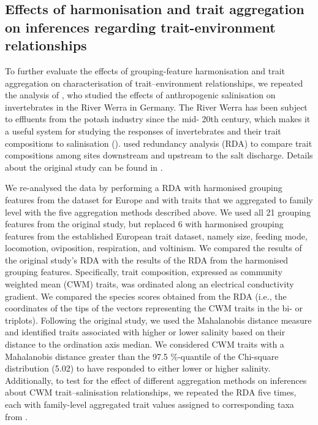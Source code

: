\documentclass[12pt]{article}
\begin{document}

\subsection*{Effects of harmonisation and trait aggregation on inferences regarding trait-environment relationships}

To further evaluate the effects of grouping-feature harmonisation and trait aggregation on characterisation of trait–environment relationships, we repeated the analysis of \citet{szocs_effects_2014}, who studied the effects of anthropogenic salinisation on invertebrates in the River Werra in Germany. The River Werra has been subject to effluents from the potash industry since the mid- 20th century, which makes it a useful system for studying the responses of invertebrates and their trait compositions to salinisation (\cite{bathe_biological_2011}). \citet{szocs_effects_2014} used redundancy analysis (RDA) to compare trait compositions among sites downstream and upstream to the salt discharge. Details about the original study can be found in \citet{szocs_effects_2014}.

We re-analysed the \citet{szocs_effects_2014} data by performing a RDA with harmonised grouping features from the dataset for Europe and with traits that we aggregated to family level with the five aggregation methods described above. We used all 21 grouping features from the original study, but replaced 6 with harmonised grouping features from the established European trait dataset, namely size, feeding mode, locomotion, oviposition, respiration, and voltinism.
We compared the results of the original study’s RDA with the results of the RDA from the harmonised grouping features. Specifically, trait composition, expressed as community weighted mean (CWM) traits, was ordinated along an electrical conductivity gradient. We compared the species scores obtained from the RDA (i.e., the coordinates of the tips of the vectors representing the CWM traits in the bi- or triplots). Following the original study, we used the Mahalanobis distance measure and identified traits associated with higher or lower salinity based on their distance to the ordination axis median. We considered CWM traits with a Mahalanobis distance greater than the 97.5 \%-quantile of the Chi-square distribution (5.02) to have responded to either lower or higher salinity. Additionally, to test for the effect of different aggregation methods on inferences about CWM trait–salinisation relationships, we repeated the RDA five times, each with family-level aggregated trait values assigned to corresponding taxa from \citet{szocs_effects_2014}.
\end{document}
